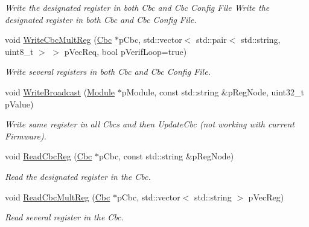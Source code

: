 \begin{CompactItemize}
\begin{CompactList}\small\item\em Write the designated register in both Cbc and Cbc Config File Write the designated register in both Cbc and Cbc Config File. \item\end{CompactList}\item 
void \hyperlink{class_ph2___hw_interface_1_1_cbc_interface_5f7c8908e36e20fc0cb784077d024784}{Write\-Cbc\-Mult\-Reg} (\hyperlink{class_ph2___hw_description_1_1_cbc}{Cbc} $\ast$p\-Cbc, std::vector$<$ std::pair$<$ std::string, uint8\_\-t $>$ $>$ p\-Vec\-Req, bool p\-Verif\-Loop=true)
\begin{CompactList}\small\item\em Write several registers in both Cbc and Cbc Config File. \item\end{CompactList}\item 
void \hyperlink{class_ph2___hw_interface_1_1_cbc_interface_81a03fe5d5d0791ff1b2cab92f6fbcdd}{Write\-Broadcast} (\hyperlink{class_ph2___hw_description_1_1_module}{Module} $\ast$p\-Module, const std::string \&p\-Reg\-Node, uint32\_\-t p\-Value)
\begin{CompactList}\small\item\em Write same register in all Cbcs and then Update\-Cbc (not working with current Firmware). \item\end{CompactList}\item 
void \hyperlink{class_ph2___hw_interface_1_1_cbc_interface_a879b96566ef29a56b606f6cb65c8656}{Read\-Cbc\-Reg} (\hyperlink{class_ph2___hw_description_1_1_cbc}{Cbc} $\ast$p\-Cbc, const std::string \&p\-Reg\-Node)
\begin{CompactList}\small\item\em Read the designated register in the Cbc. \item\end{CompactList}\item 
void \hyperlink{class_ph2___hw_interface_1_1_cbc_interface_74baf6bc4fb08739c1477de0b75de9c9}{Read\-Cbc\-Mult\-Reg} (\hyperlink{class_ph2___hw_description_1_1_cbc}{Cbc} $\ast$p\-Cbc, std::vector$<$ std::string $>$ p\-Vec\-Reg)
\begin{CompactList}\small\item\em Read several register in the Cbc. \item\end{CompactList}\item 

\end{CompactItemize}
